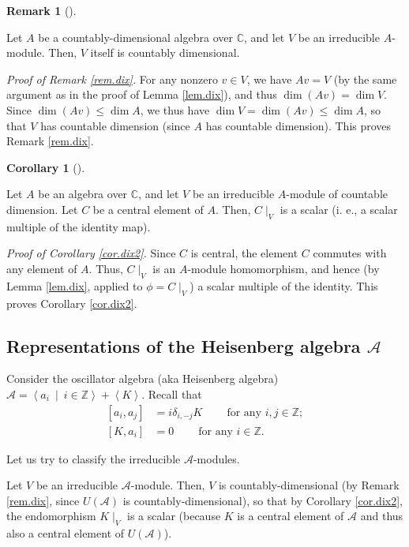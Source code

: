 \documentclass
[numbers=enddot,12pt,final,onecolumn,german,notitlepage]{scrartcl}%
\theoremstyle{definition}
\newtheorem{remk}[theo]{Remark}
\newenvironment{remark}[1][]
{\begin{remk}[#1]\begin{leftbar}}
{\end{leftbar}\end{remk}}
\newtheorem{coro}[theo]{Corollary}
\newenvironment{corollary}[1][]
{\begin{coro}[#1]\begin{leftbar}}
{\end{leftbar}\end{coro}}
\begin{document}
\begin{remark}
\label{rem.dix}Let $A$ be a countably-dimensional algebra over $\mathbb{C}$,
and let $V$ be an irreducible $A$-module. Then, $V$ itself is countably dimensional.
\end{remark}

\textit{Proof of Remark \ref{rem.dix}.} For any nonzero $v\in V$, we have
$Av=V$ (by the same argument as in the proof of Lemma \ref{lem.dix}), and thus
$\dim\left(  Av\right)  =\dim V$. Since $\dim\left(  Av\right)  \leq\dim A$,
we thus have $\dim V=\dim\left(  Av\right)  \leq\dim A$, so that $V$ has
countable dimension (since $A$ has countable dimension). This proves Remark
\ref{rem.dix}.

\begin{corollary}
\label{cor.dix2}Let $A$ be an algebra over $\mathbb{C}$, and let $V$ be an
irreducible $A$-module of countable dimension. Let $C$ be a central element of
$A$. Then, $C\mid_{V}$ is a scalar (i. e., a scalar multiple of the identity map).
\end{corollary}

\textit{Proof of Corollary \ref{cor.dix2}.} Since $C$ is central, the element
$C$ commutes with any element of $A$. Thus, $C\mid_{V}$ is an $A$-module
homomorphism, and hence (by Lemma \ref{lem.dix}, applied to $\phi=C\mid_{V}$)
a scalar multiple of the identity. This proves Corollary \ref{cor.dix2}.

\subsection{Representations of the Heisenberg algebra $\mathcal{A}$}

Consider the oscillator algebra (aka Heisenberg algebra) $\mathcal{A}%
=\left\langle a_{i}\ \mid\ i\in\mathbb{Z}\right\rangle +\left\langle
K\right\rangle $. Recall that%
\begin{align*}
\left[  a_{i},a_{j}\right]   &  =i\delta_{i,-j}K\ \ \ \ \ \ \ \ \ \ \text{for
any }i,j\in\mathbb{Z};\\
\left[  K,a_{i}\right]   &  =0\ \ \ \ \ \ \ \ \ \ \text{for any }%
i\in\mathbb{Z}.
\end{align*}


Let us try to classify the irreducible $\mathcal{A}$-modules.

Let $V$ be an irreducible $\mathcal{A}$-module. Then, $V$ is
countably-dimensional (by Remark \ref{rem.dix}, since $U\left(  \mathcal{A}%
\right)  $ is countably-dimensional), so that by Corollary \ref{cor.dix2}, the
endomorphism $K\mid_{V}$ is a scalar (because $K$ is a central element of
$\mathcal{A}$ and thus also a central element of $U\left(  \mathcal{A}\right)
$).
\end{document}
